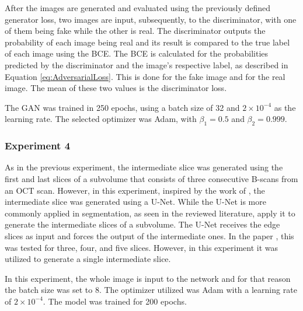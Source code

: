 After the images are generated and evaluated using the previously defined generator loss, two images are input, subsequently, to the discriminator, with one of them being fake while the other is real. The discriminator outputs the probability of each image being real and its result is compared to the true label of each image using the BCE. The BCE is calculated for the probabilities predicted by the discriminator and the image's respective label, as described in Equation \ref{eq:AdversarialLoss}. This is done for the fake image and for the real image. The mean of these two values is the discriminator loss.
\par
The GAN was trained in 250 epochs, using a batch size of 32 and $2 \times 10^{-4}$ as the learning rate. The selected optimizer was Adam, with $\beta_{1}=0.5$ and $\beta_{2}=0.999$.

\subsubsection{Experiment 4}
As in the previous experiment, the intermediate slice was generated using the first and last slices of a subvolume that consists of three consecutive B-scans from an OCT scan. However, in this experiment, inspired by the work of \textcite{Nishimoto2024}, the intermediate slice was generated using a U-Net. While the U-Net is more commonly applied in segmentation, as seen in the reviewed literature, \textcite{Nishimoto2024} apply it to generate the intermediate slices of a subvolume. The U-Net receives the edge slices as input and forces the output of the intermediate ones. In the paper \parencite{Nishimoto2024}, this was tested for three, four, and five slices. However, in this experiment it was utilized to generate a single intermediate slice.
\par
In this experiment, the whole image is input to the network and for that reason the batch size was set to 8. The optimizer utilized was Adam with a learning rate of $2 \times 10^{-4}$. The model was trained for 200 epochs.

